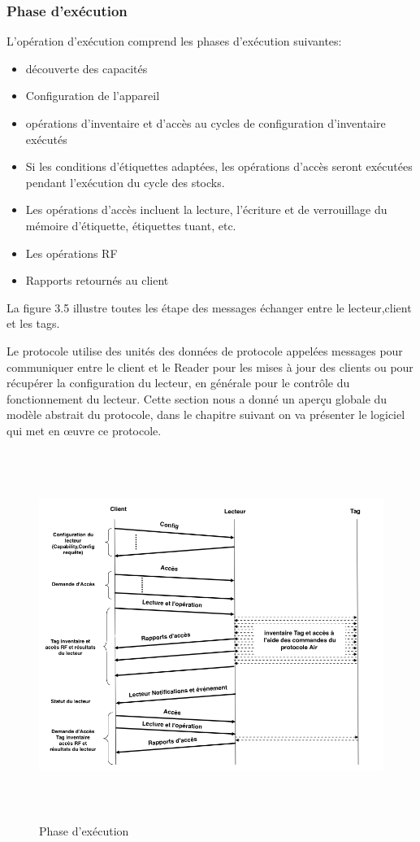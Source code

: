 \documentclass[11pt, a4paper, twoside]{book}
\begin{document}
\subsubsection{Phase d'exécution}
L'opération d'exécution comprend les phases d'exécution suivantes:
\begin{itemize}
\item découverte des capacités
\item Configuration de l'appareil
\item opérations d'inventaire et d'accès au cycles de configuration d'inventaire exécutés
\item Si les conditions d'étiquettes adaptées, les opérations d'accès seront exécutées pendant l'exécution du cycle des stocks.
\item Les opérations d'accès incluent la lecture, l'écriture et de verrouillage du mémoire d'étiquette, étiquettes tuant, etc.
\item Les opérations RF
\item Rapports retournés au client
\end{itemize}

La figure 3.5 illustre toutes les étape des messages échanger entre le lecteur,client et les tags.

Le protocole utilise des unités des données de protocole appelées messages pour communiquer entre le client et le Reader pour  les mises à jour des clients ou pour récupérer la configuration du lecteur, en générale pour le contrôle du fonctionnement du lecteur. Cette section nous a donné un aperçu globale du modèle abstrait du protocole, dans le chapitre suivant on va présenter le logiciel qui met en œuvre ce protocole.
\begin{figure}[!h]
\centering
\includegraphics[height=12cm]{runtime}
\caption{Phase d'exécution}
\end{figure}
\pagebreak
\end{document}
